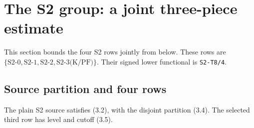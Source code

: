 \section{The S2 group: a joint three-piece estimate}
\label{sec:s2}

This section bounds the four S2 rows jointly from below. These rows are
$\{\text{S2-0},\text{S2-1},\text{S2-2},\text{S2-3(K/PF)}\}.$
Their signed lower functional is \texttt{S2-T8/4}.

\subsection{Source partition and four rows}
\label{sec:s2-1}\label{sec:s2-2}

\begin{lemma}
The plain S2 source satisfies (3.2), with the disjoint partition (3.4).
The selected third row has level and cutoff (3.5).
\end{lemma}
